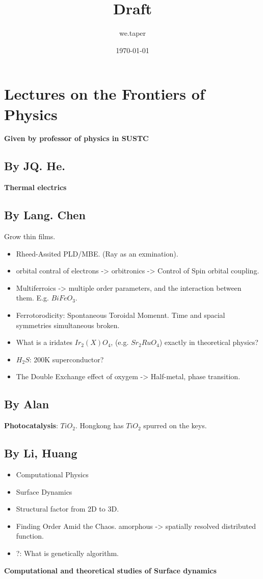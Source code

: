\documentclass{article}
\title{Draft}
\date{\today}
\author{we.taper}
\numberwithin{equation}{subsection} %
\theoremstyle{definition}
\begin{document}
\maketitle
{}
\tableofcontents

\section{Lectures on the Frontiers of Physics}
\textbf{Given by professor of physics in SUSTC}
    \subsection{By JQ. He.}
    \textbf{Thermal electrics}

    \subsection{By Lang. Chen}
    \label{sec:c.l}
    Grow thin films.
    \begin{itemize}
	\item Rheed-Assited PLD/MBE. (Ray as an exmination).
	\item 
	orbital contral of electrons -> 
	orbitronics -> Control of Spin orbital coupling.
	\item
	Multiferroics -> multiple order parameters, and the interaction
	between them. E.g. $BiFeO_3$.
	\item
	Ferrotorodicity: Spontaneous Toroidal Momennt. Time and spacial
	symmetries simultaneous broken.
	\item
	What is a iridates $Ir_2(X)O_4$, (e.g. $Sr_2RuO_4$) 
	exactly in theoretical physics?
	\item
	$H_2S$: 200K superconductor?
	\item
	The Double Exchange effect of oxygem -> Half-metal, phase transition.
    \end{itemize}

    \subsection{By Alan}
    \textbf{Photocatalysis}: $TiO_2$. Hongkong has $TiO_2$ spurred on
    the keys.

    \subsection{By Li, Huang}
    \begin{itemize}
            \item Computational Physics
            \item Surface Dynamics
            \item Structural factor from 2D to 3D.
            \item Finding Order Amid the Chaos. amorphous -> spatially
                    resolved distributed function.
            \item ?: What is genetically algorithm.
    \end{itemize}
    \textbf{Computational and theoretical studies of Surface dynamics}
    
\end{document}
